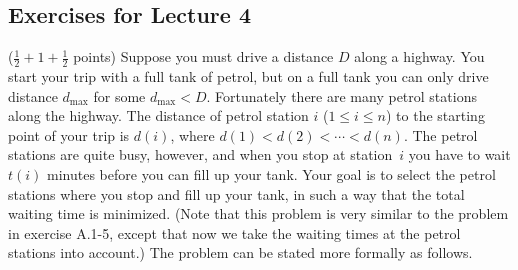 \documentclass{article}
\renewcommand{\leq}{\leqslant}
\newcounter{rcounter}
\newenvironment{rlist}%
{\begin{list}{A.2-\arabic{rcounter}}{\usecounter{rcounter}}}{\end{list}}
\newcounter{rcountermem}
\begin{document}
\subsection*{Exercises for Lecture 4}
\begin{rlist}
\setcounter{rcounter}{\value{rcountermem}}
\item ($\frac{1}{2}+1+\frac{1}{2}$ points) Suppose you must drive a distance $D$ along a highway. You start your trip with
      a full tank of petrol, but on a full tank you can
      only drive distance $d_{\max}$ for some $d_{\max}<D$. Fortunately there are many petrol stations
      along the highway. The distance of petrol station $i$ ($1\leq i\leq n$)
      to the starting point of your trip is $d(i)$, where $d(1)<d(2)<\cdots<d(n)$.
      The petrol stations are quite busy, however, and when you stop at station~$i$
      you have to wait $t(i)$ minutes before you can fill up your tank.
      Your goal is to select the petrol stations where you stop and fill up your tank,
      in such a way that the total waiting time is minimized.
      (Note that this problem is very similar to the problem in exercise
       A.1-5, except that now we take the waiting times at the petrol stations into account.)
      The problem can be stated more formally as follows.


\end{rlist}
\end{document}
